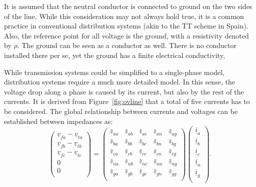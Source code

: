 \documentclass[11pt]{article}
\begin{document}
	It is assumed that the neutral conductor is connected to ground on the two sides of the line. While this consideration may not always hold true, it is a common practice in conventional distribution systems (akin to the TT scheme in Spain). Also, the reference point for all voltage is the ground, with a resistivity denoted by $\rho$. The ground can be seen as a conductor as well. There is no conductor installed there per se, yet the ground has a finite electrical conductivity, 

	While transmission systems could be simplified to a single-phase model, distribution systems require a much more detailed model. In this sense, the voltage drop along a phase is caused by its current, but also by the rest of the currents. It is derived from Figure~\ref{fig:ovline} that a total of five currents has to be considered. The global relationship between currents and voltages can be established between impedances as:
	\begin{equation}
		\begin{pmatrix}
			\underline{v}_{fa} - \underline{v}_{ta} \\
			\underline{v}_{fb} - \underline{v}_{tb} \\
			\underline{v}_{fc} - \underline{v}_{tc} \\
			0 \\
			0 \\
		\end{pmatrix}
	= \begin{pmatrix}
		\underline{z}_{aa} & \underline{z}_{ab} & \underline{z}_{ac} & \underline{z}_{an} & \underline{z}_{ag} \\
		\underline{z}_{ba} & \underline{z}_{bb} & \underline{z}_{bc} & \underline{z}_{bn} & \underline{z}_{bg} \\
		\underline{z}_{ca} & \underline{z}_{cb} & \underline{z}_{cc} & \underline{z}_{cn} & \underline{z}_{cg} \\
		\underline{z}_{na} & \underline{z}_{nb} & \underline{z}_{nc} & \underline{z}_{nn} & \underline{z}_{ng} \\
		\underline{z}_{ga} & \underline{z}_{gb} & \underline{z}_{gc} & \underline{z}_{gn} & \underline{z}_{gg} \\
	\end{pmatrix}
	\begin{pmatrix}
		\underline{i}_{a} \\
		\underline{i}_{b} \\
		\underline{i}_{c} \\
		\underline{i}_{n} \\
		\underline{i}_{g} \\
	\end{pmatrix}.
	\label{eq:comp1}
	\end{equation}
\end{document}
